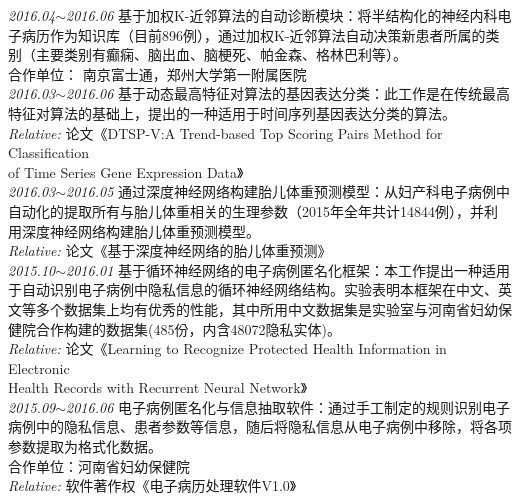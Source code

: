 \documentclass[line, margin]{res}
\newcommand{\xiaowu}{\fontsize{9pt}{15.75pt}\selectfont} %
\begin{document}
\begin{resume}
 { 
 {\sl 2016.04$\sim$2016.06} 基于加权K-近邻算法的自动诊断模块：{ 将半结构化的神经内科电\\
 子病历作为知识库（目前896例），通过加权K-近邻算法自动决策新患者所属的类\\
 别（主要类别有癫痫、脑出血、脑梗死、帕金森、格林巴利等）。\\
 {\xiaowu 合作单位： 南京富士通，郑州大学第一附属医院} }\\
[7pt] 
 {\sl 2016.03$\sim$2016.06} 基于动态最高特征对算法的基因表达分类：{ 此工作是在传统最高\\
 特征对算法的基础上，提出的一种适用于时间序列基因表达分类的算法。}\\
 {\sl\xiaowu Relative:} {\xiaowu 论文《DTSP-V:A Trend-based Top Scoring Pairs Method for Classification\\ 
 of Time Series Gene Expression Data》}\\
[7pt] 
 {\sl 2016.03$\sim$2016.05} 通过深度神经网络构建胎儿体重预测模型：{ 从妇产科电子病例中\\
 自动化的提取所有与胎儿体重相关的生理参数（2015年全年共计14844例），并利\\
 用深度神经网络构建胎儿体重预测模型。} \\
 {\sl\xiaowu Relative:} {\xiaowu 论文《基于深度神经网络的胎儿体重预测》} \\
[7pt]
 {\sl 2015.10$\sim$2016.01} 基于循环神经网络的电子病例匿名化框架：{ 本工作提出一种适用\\
 于自动识别电子病例中隐私信息的循环神经网络结构。实验表明本框架在中文、英\\
 文等多个数据集上均有优秀的性能，其中所用中文数据集是实验室与河南省妇幼保\\
 健院合作构建的数据集(485份，内含48072隐私实体)。} \\
 {\sl\xiaowu Relative:} {\xiaowu 论文《Learning to Recognize Protected Health Information in  Electronic \\
 Health Records with Recurrent Neural Network》}\\
[7pt] 
 {\sl 2015.09$\sim$2016.06} 电子病例匿名化与信息抽取软件：{ 通过手工制定的规则识别电子\\
 病例中的隐私信息、患者参数等信息，随后将隐私信息从电子病例中移除，将各项\\
 参数提取为格式化数据。\\
 {\xiaowu 合作单位：河南省妇幼保健院} } \\
 {\sl\xiaowu Relative:} {\xiaowu 软件著作权《电子病历处理软件V1.0》} \\
}
\end{resume}
\end{document}

